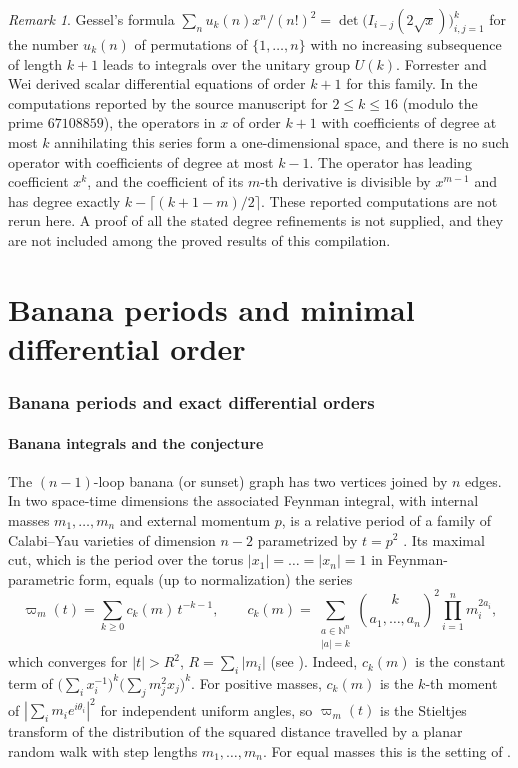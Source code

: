\documentclass[11pt,a4paper]{article}
\theoremstyle{definition}
\theoremstyle{remark}
\newtheorem{remark}[theorem]{Remark}
\numberwithin{equation}{section}
\newcommand{\N}{\mathbb{N}}
\begin{document}
\begin{remark}
Gessel's formula $\sum_nu_k(n)x^n/(n!)^2=\det\bigl(I_{i-j}(2\sqrt x)\bigr)_{i,j=1}^k$ for the number $u_k(n)$ of permutations of $\{1,\dots,n\}$ with no increasing subsequence of length $k+1$ \cite{Ges90} leads to integrals over the unitary group $U(k)$. Forrester and Wei \cite{FW26} derived scalar differential equations of order $k+1$ for this family. In the computations reported by the source manuscript for $2\le k\le16$ (modulo the prime $67108859$), the operators in $x$ of order $k+1$ with coefficients of degree at most $k$ annihilating this series form a one-dimensional space, and there is no such operator with coefficients of degree at most $k-1$. The operator has leading coefficient $x^k$, and the coefficient of its $m$-th derivative is divisible by $x^{m-1}$ and has degree exactly $k-\lceil(k+1-m)/2\rceil$. These reported computations are not rerun here. A proof of all the stated degree refinements is not supplied, and they are not included among the proved results of this compilation.
\end{remark}


\clearpage
\part{Banana periods and minimal differential order}\label{part:order}


\section{Banana periods and exact differential orders}

\subsection{Banana integrals and the conjecture}
The $(n-1)$-loop banana (or sunset) graph has two vertices joined by $n$ edges. In two space-time dimensions the associated Feynman integral, with internal masses $m_1,\dots,m_n$ and external momentum $p$, is a relative period of a family of Calabi--Yau varieties of dimension $n-2$ parametrized by $t=p^2$ \cite{BKV15,Van14,BFKNS21,LV23}. Its maximal cut, which is the period over the torus $|x_1|=\dots=|x_n|=1$ in Feynman-parametric form, equals (up to normalization) the series
\begin{equation}\label{bo:eq:varpi}
\varpi_m(t)=\sum_{k\ge0}c_k(m)\,t^{-k-1},\qquad
c_k(m)=\sum_{\substack{a\in\N^n\\ |a|=k}}\binom{k}{a_1,\dots,a_n}^{2}\prod_{i=1}^n m_i^{2a_i},
\end{equation}
which converges for $|t|>R^2$, $R=\sum_i|m_i|$ (see \cite[\S4]{LV23}). Indeed, $c_k(m)$ is the constant term of $\bigl(\sum_i x_i^{-1}\bigr)^k\bigl(\sum_j m_j^2x_j\bigr)^k$. For positive masses, $c_k(m)$ is the $k$-th moment of $|\sum_i m_ie^{i\theta_i}|^2$ for independent uniform angles, so $\varpi_m(t)$ is the Stieltjes transform of the distribution of the squared distance travelled by a planar random walk with step lengths $m_1,\dots,m_n$. For equal masses this is the setting of \cite{BSWZ12}.
\end{document}
